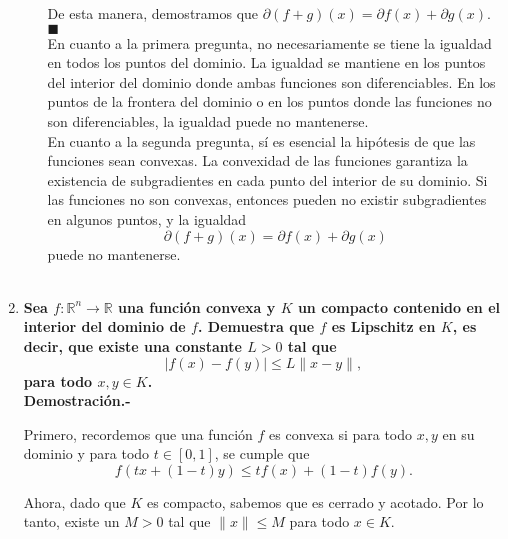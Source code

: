 \begin{enumerate}
\begin{enumerate}[\bfseries (a)]
		De esta manera, demostramos que $\partial (f+g)(x) = \partial f(x) + \partial g(x)$. $\blacksquare$\\

		En cuanto a la primera pregunta, no necesariamente se tiene la igualdad en todos los puntos del dominio. La igualdad se mantiene en los puntos del interior del dominio donde ambas funciones son diferenciables. En los puntos de la frontera del dominio o en los puntos donde las funciones no son diferenciables, la igualdad puede no mantenerse.\\

		En cuanto a la segunda pregunta, sí es esencial la hipótesis de que las funciones sean convexas. La convexidad de las funciones garantiza la existencia de subgradientes en cada punto del interior de su dominio. Si las funciones no son convexas, entonces pueden no existir subgradientes en algunos puntos, y la igualdad 
		    $$\partial (f+g)(x) = \partial f(x) + \partial g(x)$$ 
		puede no mantenerse.\\\\

	\end{enumerate}


    \item \textbf{\boldmath Sea $f : \mathbb{R}^n \to \mathbb{R}$ una función convexa y $K$ un compacto contenido en el interior del dominio de $f$. Demuestra que $f$ es Lipschitz en $K$, es decir, que existe una constante $L>0$ tal que 
    $$|f(x) - f(y)| \leq L\|x- y\|,$$ 
    para todo $x, y \in K$.}\\

	\textbf{Demostración.-}\; 

	Primero, recordemos que una función $f$ es convexa si para todo $x, y$ en su dominio y para todo $t \in [0,1]$, se cumple que
	$$f(tx + (1-t)y) \leq tf(x) + (1-t)f(y).$$

	Ahora, dado que $K$ es compacto, sabemos que es cerrado y acotado. Por lo tanto, existe un $M > 0$ tal que $\|x\| \leq M$ para todo $x \in K$. 


\end{enumerate}
